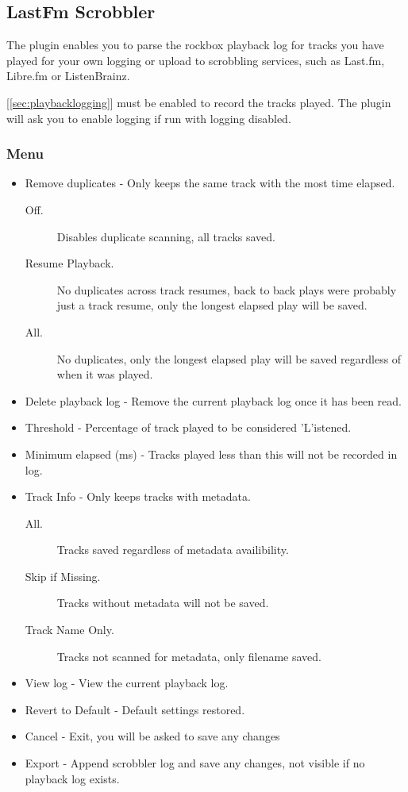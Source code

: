 \subsection{LastFm Scrobbler}\label{sec:scrobbler}
The  plugin enables you to parse the rockbox
playback log for tracks you have played for your own logging or upload
to scrobbling services, such as Last.fm, Libre.fm or ListenBrainz.

 [\ref{sec:playbacklogging}] must be enabled to record the tracks played.
The plugin will ask you to enable logging if run with logging disabled.

\subsubsection{Menu}
\begin{itemize}
\item Remove duplicates - Only keeps the same track with the most time elapsed.
  \begin{description}
  \item[Off.] Disables duplicate scanning, all tracks saved.
  \item[Resume Playback.] No duplicates across track resumes, back to back plays
        were probably just a track resume, only the longest elapsed play will be saved.
  \item[All.] No duplicates, only the longest elapsed play will be saved regardless of when it was played.
  \end{description}
\item Delete playback log - Remove the current playback log once it has been read.
\item Threshold - Percentage of track played to be considered 'L'istened.
\item Minimum elapsed (ms) - Tracks played less than this will not be recorded in log.
\item Track Info - Only keeps tracks with metadata.
  \begin{description}
  \item[All.] Tracks saved regardless of metadata availibility.
  \item[Skip if Missing.] Tracks without metadata will not be saved.
  \item[Track Name Only.] Tracks not scanned for metadata, only filename saved.
  \end{description}
\item View log - View the current playback log.
\item Revert to Default - Default settings restored.
\item Cancel - Exit, you will be asked to save any changes
\item Export - Append scrobbler log and save any changes, not visible if no playback log exists.
\end{itemize}

